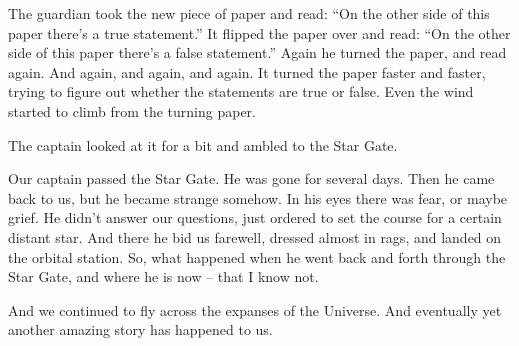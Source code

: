 \documentclass[ebook,oneside,final,openright]{memoir}
\begin{document}
\par
The guardian took the new piece of paper and read: “On the other side of this paper there’s a true statement.” It flipped the paper over and read: “On the other side of this paper there’s a false statement.” Again he turned the paper, and read again. And again, and again, and again. It turned the paper faster and faster, trying to figure out whether the statements are true or false. Even the wind started to climb from the turning paper.\par
\par
The captain looked at it for a bit and ambled to the Star Gate.\par
Our captain passed the Star Gate. He was gone for several days. Then he came back to us, but he became strange somehow. In his eyes there was fear, or maybe grief. He didn’t answer our questions, just ordered to set the course for a certain distant star. And there he bid us farewell, dressed almost in rags, and landed on the orbital station. So, what happened when he went back and forth through the Star Gate, and where he is now – that I know not. \par
\par
 And we continued to fly across the expanses of the Universe. And eventually yet another amazing story has happened to us.
\end{document}
